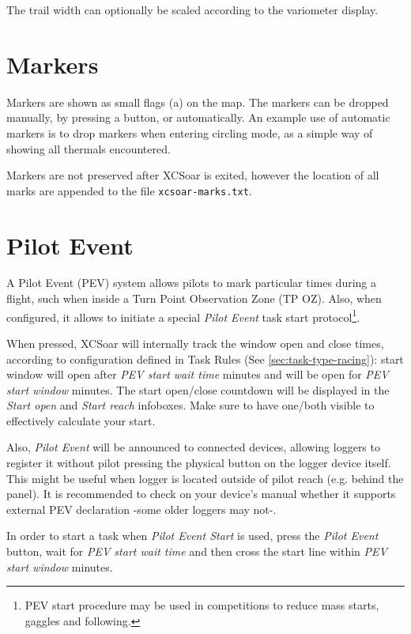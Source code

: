 The trail width can optionally be scaled according to the variometer display.


\section{Markers}\label{sec:markers}

Markers are shown as small flags (a) on the map.  The markers can be dropped
manually, by pressing a button, or automatically.  An example use of
automatic markers is to drop markers when entering circling mode, as a
simple way of showing all thermals encountered.

Markers are not preserved after XCSoar is exited, however the location
of all marks are appended to the file \verb|xcsoar-marks.txt|.

\section{Pilot Event}\label{sec:pilotevent}

A Pilot Event (PEV) system allows pilots to mark particular times during a
flight, such when inside a Turn Point Observation Zone (TP OZ). Also, when
configured, it allows to initiate a special \emph{Pilot Event} task start
protocol\footnote{PEV start procedure may be used in competitions to reduce
mass starts, gaggles and following.}.


When pressed, XCSoar will internally track the window open and close times, according 
to configuration defined in Task Rules (See \ref{sec:task-type-racing}): start
window will open after \emph{PEV start wait time}  minutes
and will be open for \emph{PEV start window} minutes. The start open/close
countdown will be displayed in the \emph{Start open} and \emph{Start reach} 
infoboxes. Make sure to have one/both visible to effectively calculate your start.

Also, \emph{Pilot Event} will be announced to connected devices, allowing loggers to
register it without pilot pressing the physical button on the logger device
itself. This might be useful when logger is located outside of pilot reach
(e.g. behind the panel). It is recommended to check on your device's manual 
whether it supports external PEV declaration -some older loggers may not-.

In order to start a task when \emph{Pilot Event Start} is used, press the \emph
{Pilot Event} button, wait for \emph{PEV start wait time} and then cross the
start line within \emph{PEV start window} minutes.

